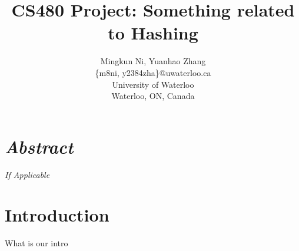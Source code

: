 \documentclass[letterpaper]{article} %
\begin{document}
	\title{CS480 Project: Something related to Hashing}
	\author{Mingkun Ni, Yuanhao Zhang\\
		\{m8ni, y2384zha\}@uwaterloo.ca\\
		University of Waterloo\\
		Waterloo, ON, Canada\\
	}
	\maketitle
	
	
	\section{\em{Abstract}}
	\textit{If Applicable}
	
	\section{Introduction}
	What is our intro
	
\end{document}
